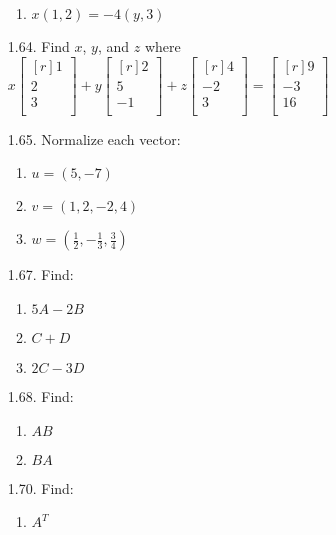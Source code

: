 \documentclass[12pt]{article}
\begin{document}
\begin{enumerate}
\begin{enumerate}
	\item $x(1,2)=-4(y,3)$
	\end{enumerate}
\item[1.64.] Find $x$, $y$, and $z$ where
	$x \begin{bmatrix}[r] 1\\ 2\\ 3\\ \end{bmatrix}
	+ y \begin{bmatrix}[r] 2\\ 5\\ -1\\ \end{bmatrix}
	+ z \begin{bmatrix}[r] 4\\ -2\\ 3\\ \end{bmatrix}
	= \begin{bmatrix}[r] 9\\ -3\\ 16\\ \end{bmatrix}$
\item[1.65.] Normalize each vector:
	\begin{enumerate}
	\item $u=(5,-7)$
	\item $v=(1,2,-2,4)$
	\item $w=(\frac{1}{2},-\frac{1}{3},\frac{3}{4})$
	\end{enumerate}
\item[1.67.] Find:
	\begin{enumerate}
	\item $5A-2B$
	\item $C+D$
	\item $2C-3D$
	\end{enumerate}
\item[1.68.] Find:
	\begin{enumerate}
	\item $AB$
	\item $BA$
	\end{enumerate}
\item[1.70.] Find:
	\begin{enumerate}
	\item $A^T$
	

\end{enumerate}
\end{enumerate}
\end{document}
